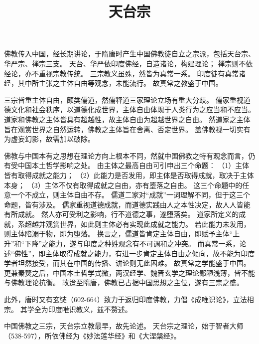 \documentclass[11pt]{article}
\title{天台宗}
\date{}
\begin{document}
  \maketitle

  \linenumbers

佛教传入中国，经长期讲论，于隋唐时产生中国佛教徒自立之宗派，包括天台宗、华严宗、禅宗三支。
天台、华严依印度佛经，自造诸论，构建理论；
禅宗则不依经论，亦不重视宗教传统。
三宗教义虽殊，然皆为真常一系。
印度徒有真常诸经，其中所主张之主体自由等观念，未能流行。
故真常之教盛于中国。

\newline

三宗皆重主体自由，颇类儒道，然儒释道三家理论立场有重大分歧。
儒家重视道德文化和社会秩序，以道德化成世界，主体自由体现于人类行为之应当和不应当。
道家和佛教之主体皆具有超越性，故主体自由为超越世界之自由。
然道家之主体旨在观赏世界之自然运转，佛教之主体旨在舍离、否定世界。
盖佛教视一切实有为虚妄幻影，故需加以破除。

\newline

佛教与中国本有之思想在理论方向上根本不同，然就中国佛教之特有观念而言，仍有受中国本土哲学影响之处。
由主体之最高自由可引申出三个命题：
（1）主体皆有取得成就之能力；
（2）此能力是否发用，即主体是否取得成就，取决于主体本身；
（3）主体不仅有取得成就之自由，亦有堕落之自由。
这三个命题中的任意一个不成立，则主体自由不存。
儒道二家对“成就”一词理解不同，但于这三个命题，皆有涉及。
儒家重视道德成就，而道德实践由人之本性决定，故人人皆能有所成就。
然人亦可受利之影响，行不道德之事，遂堕落矣。
道家所定义的成就，系超越并观赏世界，如此则主体必有实现此成就之能力。
若此能力未发用，则主体陷溺于物，即为堕落。
换言之，儒道皆肯定主体自由，即赋予主体“上升”和“下降”之能力，遂与印度之种姓观念有不可调和之冲突。
而真常一系，论述“佛性”，即主体取得成就之能力，有进一步肯定主体自由之倾向，故不能为印度学者坦然接受，而其在中国的传播、讲论则无此困难。
故真常之学能盛于中国。
更兼秦燹之后，中国本土哲学式微，两汉经学、魏晋玄学之理论鄙陋浅薄，皆不能与佛教理论抗衡。
故迨至隋唐，佛教已占据中国思想之主位，遂有三宗之盛。

\newline

此外，唐时又有玄奘（602-664）致力于返归印度佛教，力倡《成唯识论》，立法相宗。
其学全为印度唯识教义，兹不赘述。

\newline

中国佛教之三宗，天台宗立教最早，故先论述。
天台宗之理论，始于智者大师（538-597），所依佛经为《妙法莲华经》和《大涅槃经》。
\end{document}
